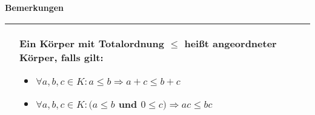 \noindent
\textbf{Bemerkungen}
\begin{table}[H]
\begin{tabularx}{\textwidth}{X m{16cm}}
    \toprule

        &   Ein Körper mit Totalordnung $\leq$ heißt \textbf{angeordneter Körper}, falls gilt:
            \begin{itemize}[topsep=-0.5cm]
                \item $\forall a,b,c \in K: a \leq b \Rightarrow a + c \leq b + c$
                \item $\forall a,b,c \in K: (a \leq b$ und $0 \leq c) \Rightarrow ac \leq bc$
            \end{itemize} \vspace{-0cm} \\

    \bottomrule
\end{tabularx}
\end{table}

\pagebreak

